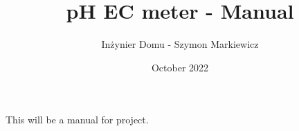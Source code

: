 \documentclass{article}
\title{pH EC meter - Manual}
\author{Inżynier Domu - Szymon Markiewicz}
\date{October 2022}
\begin{document}
\maketitle
This will be a manual for project.
\end{document}
